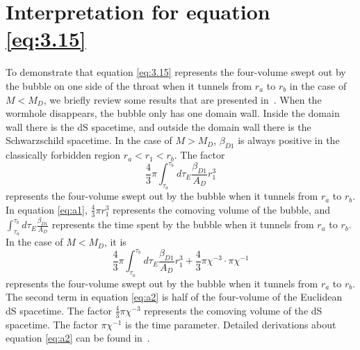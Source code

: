\documentclass[12pt]{article}
\begin{document}
\appendix

\section{Interpretation for equation \eqref{eq:3.15}}
\label{sec:A}

To demonstrate that equation \eqref{eq:3.15} represents the four-volume swept out by the bubble on one side of the throat when it tunnels from $r_{a}$ to $r_{b}$ in the case of $M<M_{D}$, we briefly review some results that are presented in~\cite{EAJ}. When the wormhole disappears, the bubble only has one domain wall. Inside the domain wall there is the dS spacetime, and outside the domain wall there is the Schwarzschild spacetime. In the case of $M>M_{D}$, $\beta_{D1}$ is always positive in the classically forbidden region $r_{a}<r_{1}<r_{b}$. The factor
\begin{equation}
\label{eq:a1}
\frac{4}{3}\pi\int_{\tau_{a}}^{\tau_{b}}d\tau_{E}\frac{\beta_{D1}}{A_{D}}r_{1}^{3}
\end{equation}
represents the four-volume swept out by the bubble when it tunnels from $r_{a}$ to $r_{b}$. In equation \eqref{eq:a1}, $\frac{4}{3}\pi r_{1}^{3}$ represents the comoving volume of the bubble, and $\int_{\tau_{a}}^{\tau_{b}}d\tau_{E}\frac{\beta_{D1}}{A_{D}}$ represents the time spent by the bubble when it tunnels from $r_{a}$ to $r_{b}$. In the case of $M<M_{D}$, it is
\begin{equation}
\label{eq:a2}
\frac{4}{3}\pi\int_{\tau_{a}}^{\tau_{b}}d\tau_{E}\frac{\beta_{D1}}{A_{D}}r_{1}^{3}+\frac{4}{3}\pi\chi^{-3}\cdot\pi\chi^{-1}
\end{equation}
represents the four-volume swept out by the bubble when it tunnels from $r_{a}$ to $r_{b}$. The second term in equation \eqref{eq:a2} is half of the four-volume of the Euclidean dS spacetime. The factor $\frac{4}{3}\pi\chi^{-3}$ represents the comoving volume of the dS spacetime. The factor $\pi\chi^{-1}$ is the time parameter. Detailed derivations about equation \eqref{eq:a2} can be found in~\cite{EAJ}.
\end{document}
